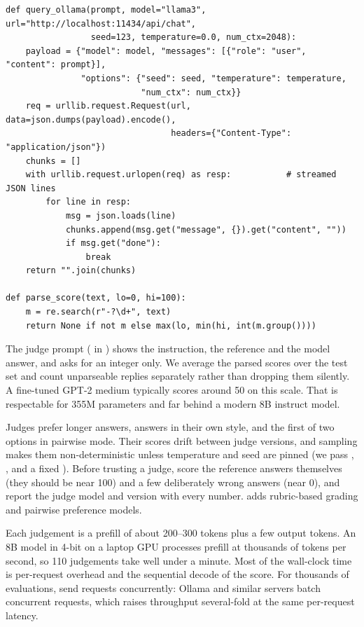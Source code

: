 \begin{lstlisting}[caption={A minimal Ollama client and a scoring prompt.},label={lst:instruct:ollama}]
def query_ollama(prompt, model="llama3", url="http://localhost:11434/api/chat",
                 seed=123, temperature=0.0, num_ctx=2048):
    payload = {"model": model, "messages": [{"role": "user", "content": prompt}],
               "options": {"seed": seed, "temperature": temperature,
                           "num_ctx": num_ctx}}
    req = urllib.request.Request(url, data=json.dumps(payload).encode(),
                                 headers={"Content-Type": "application/json"})
    chunks = []
    with urllib.request.urlopen(req) as resp:           # streamed JSON lines
        for line in resp:
            msg = json.loads(line)
            chunks.append(msg.get("message", {}).get("content", ""))
            if msg.get("done"):
                break
    return "".join(chunks)

def parse_score(text, lo=0, hi=100):
    m = re.search(r"-?\d+", text)
    return None if not m else max(lo, min(hi, int(m.group())))
\end{lstlisting}

The judge prompt ( in ) shows the
instruction, the reference and the model answer, and asks for an integer only. We
average the parsed scores over the test set and count unparseable replies separately
rather than dropping them silently. A fine-tuned GPT-2 medium typically scores
around 50 on this scale. That is respectable for 355M parameters and far behind a
modern 8B instruct model.

\begin{pitfall}
Judges prefer longer answers, answers in their own style, and the first of two options
in pairwise mode. Their scores drift between judge versions, and sampling makes them
non-deterministic unless temperature and seed are pinned (we pass
, , and a fixed ). Before trusting
a judge, score the reference answers themselves (they should be near 100) and a few
deliberately wrong answers (near 0), and report the judge model and version with every
number.  adds rubric-based grading and pairwise preference models.
\end{pitfall}

\begin{napkinmath}
Each judgement is a prefill of about 200--300 tokens plus a few output tokens. An 8B
model in 4-bit on a laptop GPU processes prefill at thousands of tokens per second, so
110 judgements take well under a minute. Most of the wall-clock time is per-request
overhead and the sequential decode of the score. For thousands of evaluations, send
requests concurrently: Ollama and similar servers batch concurrent requests, which
raises throughput several-fold at the same per-request latency.
\end{napkinmath}

